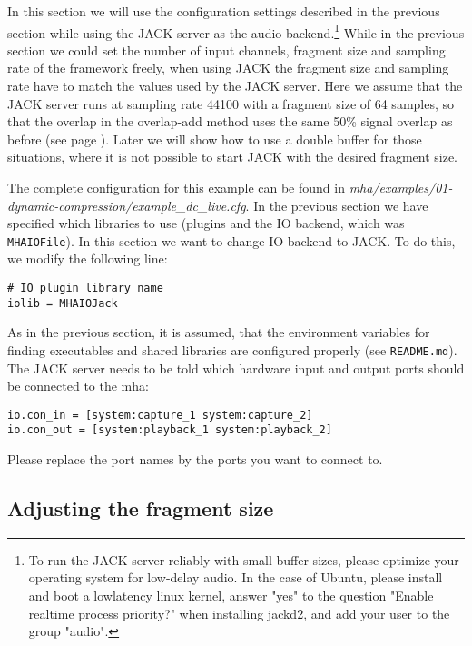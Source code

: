 In this section we will use the configuration settings described in
the previous section while using the JACK server as the audio
backend.\footnote{To run the JACK server reliably with small buffer
  sizes, please optimize your operating system for low-delay audio. In
  the case of Ubuntu, please install and boot a lowlatency linux
  kernel, answer "yes" to the question "Enable realtime process
  priority?" when installing jackd2, and add your user to the group
  "audio".
}
%
While in the previous section
we could  set the number of 
input channels, fragment size and sampling rate of the framework freely,
when using JACK the fragment size
and sampling rate have to match the values used by the JACK server.
%
Here we assume that the JACK server runs at sampling rate 44100 with a
fragment size of 64 samples, so that the overlap in the overlap-add
method uses the same 50\% signal overlap as before (see page
\pageref{overlapexplanation}).
%
Later we will show how to use a double buffer for those
situations, where it is not possible to start JACK with the desired
fragment size. 

The complete configuration for this example can be found in \emph{mha/examples/01-dynamic-compression/example\_dc\_live.cfg}.  In the previous section we have specified which libraries to use 
(plugins and the IO backend, which was \verb!MHAIOFile!). In this section 
we want to change IO backend to JACK. 
%
To do this, we modify the following line:
\begin{verbatim}
# IO plugin library name
iolib = MHAIOJack
\end{verbatim}
%
As in the previous section, it is assumed, that the environment
variables for finding executables and shared libraries are configured
properly (see \verb!README.md!).
%
The JACK server needs to be told which hardware input and output ports should be
connected to the mha:
\begin{verbatim}
io.con_in = [system:capture_1 system:capture_2]
io.con_out = [system:playback_1 system:playback_2]
\end{verbatim}
Please replace the port names by the ports you want to connect
to.
%
\subsection{Adjusting the fragment size}%
%
%

